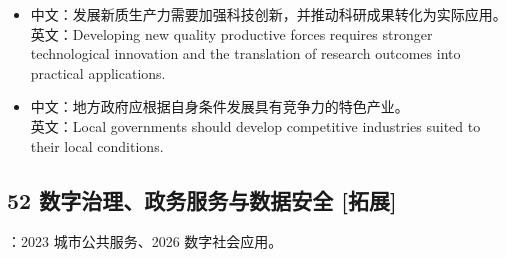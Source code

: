 \documentclass[a4paper,11pt,UTF8,fontset=none]{ctexart}
\begin{document}
\par

\begin{itemize}[leftmargin=1.7em,itemsep=1pt,parsep=0pt,topsep=2pt]
\item \noindent 中文：发展新质生产力需要加强科技创新，并推动科研成果转化为实际应用。\\ 英文：Developing new quality productive forces requires stronger technological innovation and the translation of research outcomes into practical applications.\par


\item \noindent 中文：地方政府应根据自身条件发展具有竞争力的特色产业。\\ 英文：Local governments should develop competitive industries suited to their local conditions.\par


\end{itemize}

\subsection{52 数字治理、政务服务与数据安全 {\color{AccentBlue} [拓展]}}

\begin{tcolorbox}[enhanced,breakable,boxrule=0.35pt,colback=VeryPaleBlue,colframe=AccentBlue!40,left=7pt,right=7pt,top=4pt,bottom=4pt,borderline west={2pt}{0pt}{AccentBlue},before skip=4pt,after skip=6pt]
：2023 城市公共服务、2026 数字社会应用。\par


\end{tcolorbox}
\end{document}
